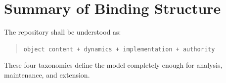 \documentclass[11pt]{article}
\begin{document}
\section*{Summary of Binding Structure}

The repository shall be understood as:

\begin{quote}
\texttt{object content + dynamics + implementation + authority}
\end{quote}

These four taxonomies define the model completely enough for analysis, maintenance, and extension.
\end{document}
